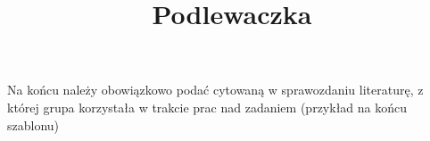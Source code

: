 \documentclass{classrep}
\author{
  \studentinfo{KONRAD PŁAWIK}{191458} \and
  \studentinfo{Vladislav Mazur}{199185} \and
  \studentinfo{Łukasz Połubiński}{211833}
}
\title{Podlewaczka}
\begin{document}
\maketitle



\begin{thebibliography}{0}
\end{thebibliography}
{\color{blue} 
Na końcu należy obowiązkowo podać cytowaną w sprawozdaniu
literaturę, z której grupa korzystała w trakcie prac nad zadaniem (przykład na
końcu szablonu)}
\end{document}
